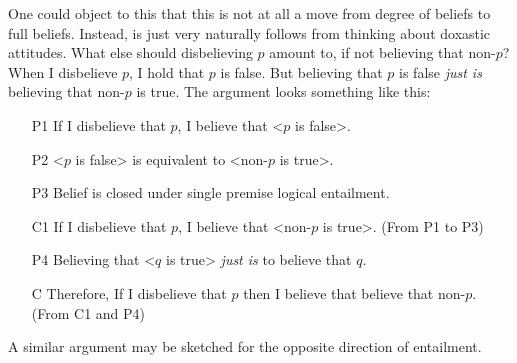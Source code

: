 \documentclass[12pt,numbers=noenddot]{scrartcl}
\begin{document}
One could object to this that this is not at all a move from degree of beliefs to full beliefs. Instead, is just very naturally follows from thinking about doxastic attitudes. What else should disbelieving $p$ amount to, if not believing that non-$p$? When I disbelieve $p$, I hold that $p$ is false. But believing that $p$ is false \emph{just is} believing that non-$p$ is true. The argument looks something like this:

\begin{enumerate}
\item [P1] If I disbelieve that $p$, I believe that <$p$ is false>. 
\item [P2] <$p$ is false> is equivalent to <non-$p$ is true>.
\item [P3] Belief is closed under single premise logical entailment.
\item [C1] If I disbelieve that $p$, I believe that <non-$p$ is true>. (From P1 to P3)
\item [P4] Believing that <$q$ is true> \emph{just is} to believe that $q$.
\item [C] Therefore, If I disbelieve that $p$ then I believe that believe that non-$p$. (From C1 and P4)
\end{enumerate}

A similar argument may be sketched for the opposite direction of entailment.
\end{document}
